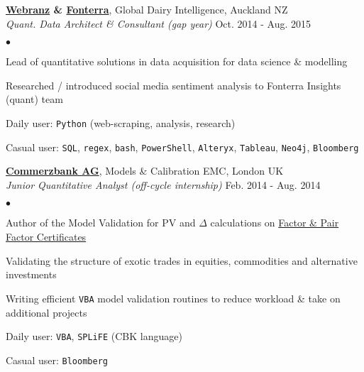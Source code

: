 \documentclass[margin, line]{res}
\newcommand{\algo}{https://twitter.com/flipdazed}
\newcommand{\Webranz}{http://webranz.com}
\newcommand{\cbkPF}{http://www2.warrants.commerzbank.com/Products/ProductSearchAdvanced.aspx?pc=228&c=2181036}
\newcommand{\cbk}{https://www.commerzbank.com/}
\newcommand{\SC}{http://www.jstor.org/discover/10.2307/2330812?uid=3738032&uid=2&uid=4&sid=21104643963563}
\newcommand{\LV}{http://en.wikipedia.org/wiki/Local_volatility}
\newcommand{\Fonterra}{https://www.fonterra.com/nz/en/About/Global+Dairy+Trade} %
\newenvironment{list2}{
	\begin{list}{$\bullet$}{%
		\setlength{\itemsep}{0in}
		\setlength{\parsep}{0in} \setlength{\parskip}{0in}
		\setlength{\topsep}{0in} \setlength{\partopsep}{0in}
		\setlength{\leftmargin}{0.2in}}}{\end{list}}
\begin{document}
\begin{resume}
{\bf \href{\Webranz}{Webranz} \& \href{\Fonterra}{Fonterra}}, 
	Global Dairy Intelligence, Auckland NZ \\
\vspace{-.3cm}
{\em Quant. Data Architect \& Consultant (gap year)}
	\hfill{ Oct. 2014 - Aug. 2015}\\

\begin{list2}
\item Lead of quantitative solutions in data acquisition for data science \& modelling
\item Researched / introduced social media sentiment analysis to Fonterra Insights (quant) team
\item Daily user: \verb|Python| (web-scraping, analysis, research)
\item Casual user: \verb|SQL|, \verb|regex|, \verb|bash|, \verb|PowerShell|, \verb|Alteryx|, \verb|Tableau|, \verb|Neo4j|, \verb|Bloomberg|
\end{list2}

{\bf \href{\cbk}{Commerzbank AG}}, Models \& Calibration EMC, London UK \\
\vspace{-.3cm}
{\em Junior Quantitative Analyst (off-cycle internship)} 
\hfill { Feb. 2014 - Aug. 2014}\\

\begin{list2}
\item Author of the Model Validation for PV and $\Delta$ calculations on
\href{\cbkPF}{Factor \& Pair Factor Certificates}
\item Validating the structure of exotic trades in equities, commodities and alternative investments
\item Writing efficient \verb|VBA| model validation routines to reduce workload \& take on additional projects
\item Daily user: \verb|VBA|, \verb|SPLiFE| (CBK language)
\item Casual user: \verb|Bloomberg|
\end{list2}


\end{resume}
\end{document}
